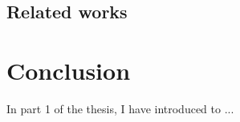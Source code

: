 \subsection{Related works}
	
\section{Conclusion}
In part 1 of the thesis, I have introduced to ...



